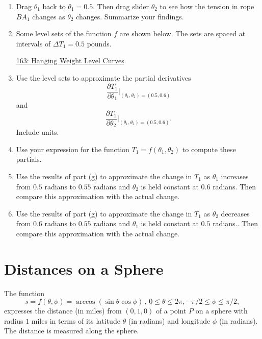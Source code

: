 \documentclass{ximera}
\begin{document}
\begin{question}
\begin{enumerate}
\item Drag $\theta_1$ back to $\theta_1=0.5$. Then drag slider $\theta_2$ to see how the tension  in rope $BA_1$ changes as $\theta_2$ changes. Summarize your findings.

\item Some level sets of the function $f$ are shown below. The sets are spaced at intervals of $\Delta T_1 = 0.5$ pounds.


\begin{onlineOnly}
    \begin{center}
\end{center}
\end{onlineOnly}

\href{https://www.desmos.com/calculator/iahtoxdhzu}{163: Hanging Weight Level Curves}

\item Use the level sets to approximate the partial derivatives
\[
    \frac{\partial T_1}{\partial \theta_1} \Big|_{(\theta_1, \theta_2)=(0.5, 0.6)}
\]
and
\[
    \frac{\partial T_1}{\partial \theta_2} \Big|_{(\theta_1, \theta_2)=(0.5, 0.6)} .
\]
Include units.


\item Use your expression for the function $T_1 = f(\theta_1, \theta_2)$ to compute these partials.

\item Use the results of part (g) to approximate the change in $T_1$ as $\theta_1$ increases from $0.5$ radians to $0.55$ radians and $\theta_2$ is held constant at $0.6$ radians. Then compare this approximation with the actual change.

\item Use the results of part (g) to approximate the change in $T_1$ as $\theta_2$ decreases from $0.6$ radians to $0.55$ radians and $\theta_1$ is held constant at $0.5$ radians.. Then compare this approximation with the actual change.



\end{enumerate}
\end{question}

\section{Distances on a Sphere}
The function
\[
 s = f(\theta,\phi) = \arccos(\sin\theta \cos \phi) \, , \, 0\leq \theta \leq 2\pi, -\pi/2\leq \phi \leq \pi/2 ,
\]
expresses the distance (in miles) from $(0,1,0)$ of a point $P$ on a sphere with radius $1$ miles in terms of its latitude $\theta$ (in radians) and longitude $\phi$ (in radians). The distance is measured along the sphere.
\end{document}
